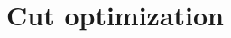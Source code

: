 \documentclass[../thesis.tex]{subfiles}
\begin{document}
\chapter{Cut optimization}
\label{chap:cutOptim}
\end{document}
